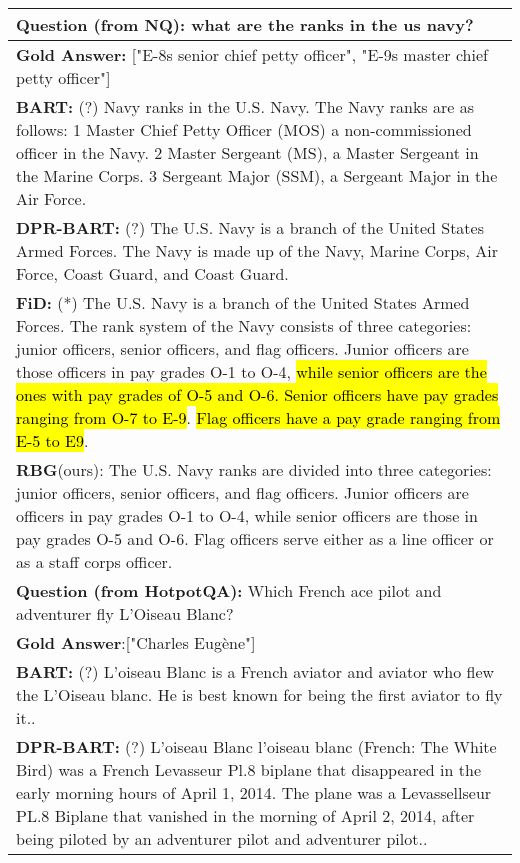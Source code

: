 \documentclass[11pt]{article}
\DeclareRobustCommand{\hlgreen}[1]{{\sethlcolor{soulgreen}\hl{#1}}}
\begin{document}
\begin{table*}[!th]
\small
\centering
\begin{adjustbox}{width={0.90\textwidth},totalheight={\textheight},keepaspectratio}
\begin{tabular}{p{}}
\hline
\textbf{Question (from NQ):} what are the ranks in the us navy? \\
\hline
\textbf{Gold Answer:} ["E-8s senior chief petty officer", "E-9s master chief petty officer"] \\
\textbf{BART:}  (?) Navy ranks in the U.S. Navy. The Navy ranks are as follows: 1  Master Chief Petty Officer (MOS) a non-commissioned officer in the Navy. 2  Master Sergeant (MS), a Master Sergeant in the Marine Corps. 3  Sergeant Major (SSM), a Sergeant Major in the Air Force. \\
\textbf{DPR-BART:}  (?) The U.S. Navy is a branch of the United States Armed Forces. The Navy is made up of the Navy, Marine Corps, Air Force, Coast Guard, and Coast Guard.\\
\textbf{FiD:}  (*) The U.S. Navy is a branch of the United States Armed Forces. The rank system of the Navy consists of three categories: junior officers, senior officers, and flag officers. Junior officers are those officers in pay grades O-1 to O-4, \hlgreen{while senior officers are the ones with pay grades of O-5 and O-6. Senior officers have pay grades ranging from O-7 to E-9}. \hlgreen{Flag officers have a pay grade ranging from E-5 to E9}. \\
\textbf{RBG}(ours): The U.S. Navy ranks are divided into three categories: junior officers, senior officers, and flag officers. Junior officers are officers in pay grades O-1 to O-4, while senior officers are those in pay grades O-5 and O-6. Flag officers serve either as a line officer or as a staff corps officer. \\
\hline
\hline
\textbf{Question (from HotpotQA):} Which  French ace pilot and adventurer fly L'Oiseau Blanc?  \\
\hline
\textbf{Gold Answer}:["Charles Eugène"] \\
\textbf{BART:} (?) L'oiseau Blanc is a French aviator and aviator who flew the L'Oiseau blanc. He is best known for being the first aviator to fly it.. \\
\textbf{DPR-BART:} (?) L'oiseau Blanc l'oiseau blanc (French: The White Bird) was a French Levasseur Pl.8 biplane that disappeared in the early morning hours of April 1, 2014. The plane was a Levassellseur PL.8 Biplane that vanished in the morning of April 2, 2014, after being piloted by an adventurer pilot and adventurer pilot..\\

\end{tabular}
\end{adjustbox}
\end{table*}
\end{document}
